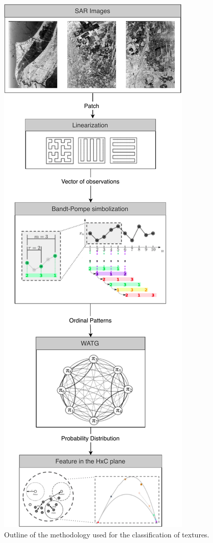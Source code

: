 \documentclass[journal]{IEEEtran}
\begin{document}
	
	\begin{figure}[hbt]
		\centering
		\includegraphics[width=.7\columnwidth]{Figures/methodology.pdf}
		\caption{Outline of the methodology used for the classification of textures.}
		\label{fig:WATG}
	\end{figure}
	
\end{document}
